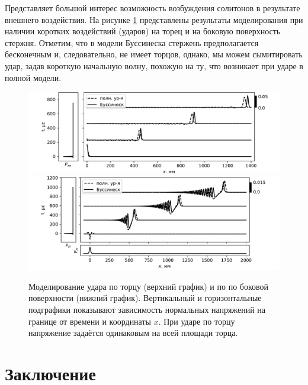 \documentclass[12pt, a4paper]{article}
\begin{document}
Представляет большой интерес возможность возбуждения солитонов в результате внешнего воздействия. На рисунке \ref{fig:impact} представлены результаты моделирования при наличии коротких воздействий (ударов) на торец и на боковую поверхность стержня. Отметим, что в модели Буссинеска стержень предполагается бесконечным и, следовательно, не имеет торцов, однако, мы можем сымитировать удар, задав короткую начальную волну, похожую на ту, что возникает при ударе в полной модели.
\begin{figure}[h!]
	\centering
	\includegraphics[width=0.85\linewidth]{figures/ImpactSmall}
	\includegraphics[width=0.85\linewidth]{figures/SurfImpactSmall}
	\caption{Моделирование удара по торцу (верхний график) и по по боковой поверхности (нижний график). Вертикальный и горизонтальные подграфики показывают зависимость нормальных напряжений на границе от времени и координаты $x$. При ударе по торцу напряжение задаётся одинаковым на всей площади торца.}
	\label{fig:impact}
	\vspace{-7mm}
\end{figure}






\section{Заключение}
\end{document}
